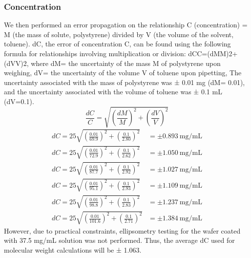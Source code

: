 \documentclass[twocolumn]{article}
\begin{document}
                \subsubsection{Concentration}
                    We then performed an error propagation on the relationship C (concentration) = M (the mass of solute, polystyrene) divided by V (the volume of the solvent, toluene). dC, the error of concentration C, can be found using the following formula for relationships involving multiplication or division: dCC=(dMM)2+(dVV)2, where dM= the uncertainty of the mass M of polystyrene upon weighing, dV= the uncertainty of the volume V of toluene upon pipetting, The uncertainty associated with the mass of polystyrene was ± 0.01 mg (dM= 0.01), and the uncertainty associated with the volume of toluene was ± 0.1 mL (dV=0.1). 
                    \begin{equation}
                        \frac{dC}{C} = \sqrt{(\frac{dM}{M})^2 + (\frac{dV}{V})^2}
                    \end{equation}
                    \begin{align}
                        dC = 25\sqrt{(\frac{0.01}{69.9})^2 + (\frac{0.1}{2.80})^2} &= \pm \qty{0.893}{\milli\gram\per\milli\liter}\\
                        dC = 25\sqrt{(\frac{0.01}{72.9})^2 + (\frac{0.1}{2.62})^2} &= \pm \qty{1.050}{\milli\gram\per\milli\liter}\\
                        dC = 25\sqrt{(\frac{0.01}{87.7})^2 + (\frac{0.1}{2.92})^2} &= \pm \qty{1.027}{\milli\gram\per\milli\liter}\\
                        dC = 25\sqrt{(\frac{0.01}{95.1})^2 + (\frac{0.1}{2.93})^2} &= \pm \qty{1.109}{\milli\gram\per\milli\liter}\\
                        dC = 25\sqrt{(\frac{0.01}{98.8})^2 + (\frac{0.1}{2.83})^2} &= \pm \qty{1.237}{\milli\gram\per\milli\liter}\\
                        dC = 25\sqrt{(\frac{0.01}{101.6})^2 + (\frac{0.1}{2.71})^2} &= \pm \qty{1.384}{\milli\gram\per\milli\liter}
                    \end{align}
                    However, due to practical constraints, ellipsometry testing for the wafer coated with 37.5 mg/mL solution was not performed. Thus, the average dC used for molecular weight calculations will be ± 1.063.
\end{document}
